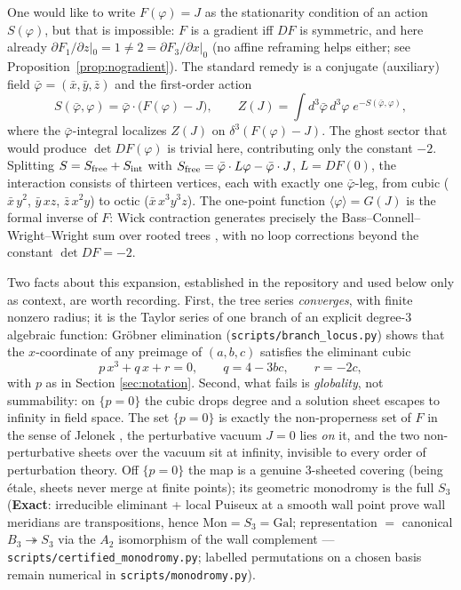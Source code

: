 \documentclass[11pt]{article}
\theoremstyle{definition}
\theoremstyle{remark}
\begin{document}
One would like to write $F(\varphi)=J$ as the stationarity condition of
an action $S(\varphi)$, but that is impossible: $F$ is a gradient iff
$DF$ is symmetric, and here already
$\partial F_1/\partial z|_0 = 1 \ne 2 = \partial F_3/\partial x|_0$
(no affine reframing helps either; see
Proposition~\ref{prop:nogradient}).
The standard remedy \cite{Abd03} is a conjugate (auxiliary) field
$\bar\varphi=(\bar x,\bar y,\bar z)$ and the first-order action
\[
S(\bar\varphi,\varphi) = \bar\varphi\cdot\bigl(F(\varphi)-J\bigr),
\qquad
Z(J) = \int d^3\bar\varphi\, d^3\varphi\; e^{-S(\bar\varphi,\varphi)},
\]
where the $\bar\varphi$-integral localizes $Z(J)$ on
$\delta^3(F(\varphi)-J)$. The ghost sector that would produce
$\det DF(\varphi)$ is trivial here, contributing only the constant
$-2$. Splitting $S = S_{\rm free} + S_{\rm int}$ with
$S_{\rm free} = \bar\varphi\cdot L\varphi - \bar\varphi\cdot J$,
$L = DF(0)$, the interaction consists of thirteen vertices, each with
exactly one $\bar\varphi$-leg, from cubic ($\bar x\, y^2$, $\bar y\, xz$,
$\bar z\, x^2y$) to octic ($\bar x\, x^3y^3z$). The one-point function
$\langle\varphi\rangle = G(J)$ is the formal inverse of $F$: Wick
contraction generates precisely the Bass--Connell--Wright--Wright sum
over rooted trees \cite{BCW82,Wri87}, with no loop corrections beyond
the constant $\det DF = -2$.

Two facts about this expansion, established in the repository and used
below only as context, are worth recording. First, the tree series
\emph{converges}, with finite nonzero radius; it is the Taylor series of
one branch of an explicit degree-3 algebraic function: Gr\"obner
elimination (\texttt{scripts/branch\_locus.py}) shows that the
$x$-coordinate of any preimage of $(a,b,c)$ satisfies the eliminant
cubic
\begin{equation}\label{eq:cubic}
p\,x^3 + q\,x + r = 0,\qquad
q = 4-3bc, \qquad r = -2c,
\end{equation}
with $p$ as in Section \ref{sec:notation}. Second, what fails is
\emph{globality}, not summability: on $\{p=0\}$ the cubic drops degree
and a solution sheet escapes to infinity in field space. The set
$\{p=0\}$ is exactly the non-properness set of $F$ in the sense of
Jelonek \cite{Jel93}, the perturbative vacuum $J=0$ lies \emph{on} it,
and the two non-perturbative sheets over the vacuum sit at infinity,
invisible to every order of perturbation theory. Off $\{p=0\}$ the map
is a genuine 3-sheeted covering (being \'etale, sheets never merge at
finite points); its geometric monodromy is the full $S_3$
(\textbf{Exact}: irreducible eliminant + local Puiseux at a smooth
wall point prove wall meridians are transpositions, hence
$\mathrm{Mon}=S_3=\mathrm{Gal}$; representation $=$ canonical
$B_3\twoheadrightarrow S_3$ via the $A_2$ isomorphism of the wall
complement --- \texttt{scripts/certified\_monodromy.py}; labelled
permutations on a chosen basis remain numerical in
\texttt{scripts/monodromy.py}).
\end{document}
